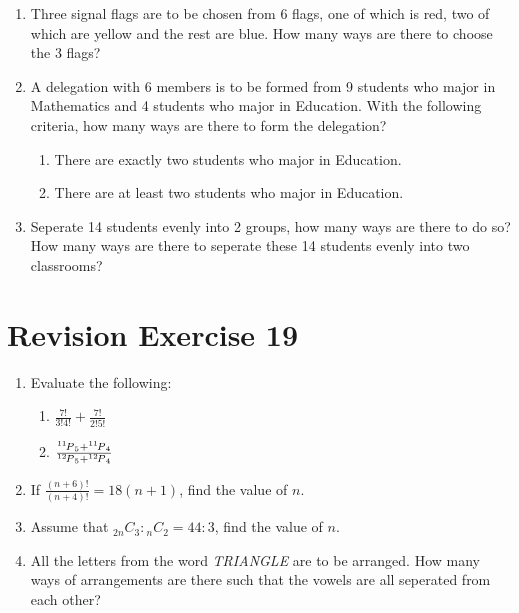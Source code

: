 \documentclass{report}
\newcommand\perm[2][^n]{\prescript{#1\mkern-2.5mu}{}P_{#2}}
\newcommand\comb[2][^n]{{}_{#1}C_{#2}}
\begin{document}
\begin{multicols}{2}
\begin{enumerate}
    \item Three signal flags are to be chosen from 6 flags, one of which is red, two of
          which are yellow and the rest are blue. How many ways are there to choose the 3
          flags?

    \item A delegation with 6 members is to be formed from 9 students who major in
          Mathematics and 4 students who major in Education. With the following criteria,
          how many ways are there to form the delegation?
          \begin{enumerate}
            \item There are exactly two students who major in Education.
            \item There are at least two students who major in Education.
          \end{enumerate}

    \item Seperate 14 students evenly into 2 groups, how many ways are there to do so?
          How many ways are there to seperate these 14 students evenly into two
          classrooms?

  \end{enumerate}

  \section{Revision Exercise 19}

  \begin{enumerate}
    \item Evaluate the following:
          \begin{enumerate}
            \item $\frac{7!}{3!4!} + \frac{7!}{2!5!}$
            \item $\frac{\perm[11]{5} + \perm[11]{4}}{\perm[12]{5} + \perm[12]{4}}$
          \end{enumerate}

    \item If $\frac{(n+6)!}{(n+4)!} = 18(n+1)$, find the value of $n$.

    \item Assume that $\comb[2n]{3}:\comb[n]{2} = 44:3$, find the value of $n$.

    \item All the letters from the word \textit{TRIANGLE} are to be arranged. How many
          ways of arrangements are there such that the vowels are all seperated from each
          other?


\end{enumerate}
\end{multicols}
\end{document}
